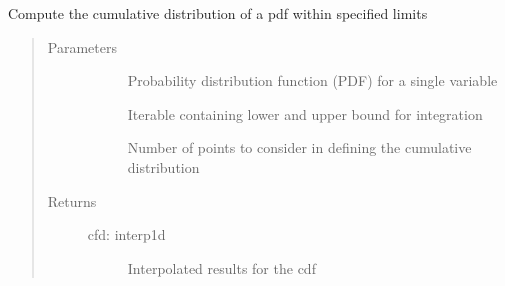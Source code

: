 \documentclass[letterpaper,10pt,english]{sphinxmanual}
\begin{document}

\begin{fulllineitems}
\label{\detokenize{stochprop.eofs:stochprop.eofs.build_cdf}}
Compute the cumulative distribution of a pdf within specified limits
\begin{quote}\begin{description}
\item[{Parameters}] \leavevmode\begin{description}
\item[{}] \leavevmode
Probability distribution function (PDF) for a single variable

\item[{}] \leavevmode
Iterable containing lower and upper bound for integration

\item[{}] \leavevmode
Number of points to consider in defining the cumulative distribution

\end{description}

\item[{Returns}] \leavevmode\begin{description}
\item[{cfd: interp1d}] \leavevmode
Interpolated results for the cdf

\end{description}

\end{description}\end{quote}

\end{fulllineitems}

\end{document}
